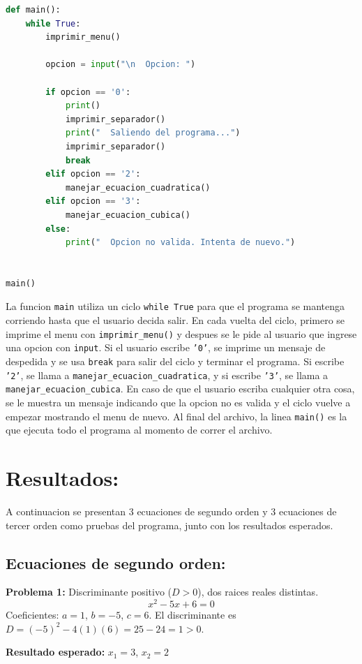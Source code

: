\documentclass[letterpaper,12pt]{article}
\begin{document}
    \begin{lstlisting}[language=Python, basicstyle=\ttfamily\scriptsize, caption={Función principal main}, label={lst:main}]
def main():
    while True:
        imprimir_menu()

        opcion = input("\n  Opcion: ")

        if opcion == '0':
            print()
            imprimir_separador()
            print("  Saliendo del programa...")
            imprimir_separador()
            break
        elif opcion == '2':
            manejar_ecuacion_cuadratica()
        elif opcion == '3':
            manejar_ecuacion_cubica()
        else:
            print("  Opcion no valida. Intenta de nuevo.")


main()
    \end{lstlisting}

    La funcion \texttt{main} utiliza un ciclo \texttt{while True} para que el programa se mantenga corriendo hasta que el usuario decida salir. En cada vuelta del ciclo, primero se imprime el menu con \texttt{imprimir\_menu()} y despues se le pide al usuario que ingrese una opcion con \texttt{input}. Si el usuario escribe \texttt{'0'}, se imprime un mensaje de despedida y se usa \texttt{break} para salir del ciclo y terminar el programa. Si escribe \texttt{'2'}, se llama a \texttt{manejar\_ecuacion\_cuadratica}, y si escribe \texttt{'3'}, se llama a \texttt{manejar\_ecuacion\_cubica}. En caso de que el usuario escriba cualquier otra cosa, se le muestra un mensaje indicando que la opcion no es valida y el ciclo vuelve a empezar mostrando el menu de nuevo. Al final del archivo, la linea \texttt{main()} es la que ejecuta todo el programa al momento de correr el archivo.
    
    \newpage
    
    \section{Resultados:}

    A continuacion se presentan 3 ecuaciones de segundo orden y 3 ecuaciones de tercer orden como pruebas del programa, junto con los resultados esperados.

    \subsection{Ecuaciones de segundo orden:}

    \textbf{Problema 1:} Discriminante positivo ($D > 0$), dos raices reales distintas.
    \begin{equation}
        x^2 - 5x + 6 = 0
    \end{equation}
    Coeficientes: $a = 1$, $b = -5$, $c = 6$. El discriminante es $D = (-5)^2 - 4(1)(6) = 25 - 24 = 1 > 0$.
    \begin{center}
        \textbf{Resultado esperado:} $x_1 = 3$, \quad $x_2 = 2$
    \end{center}
\end{document}
